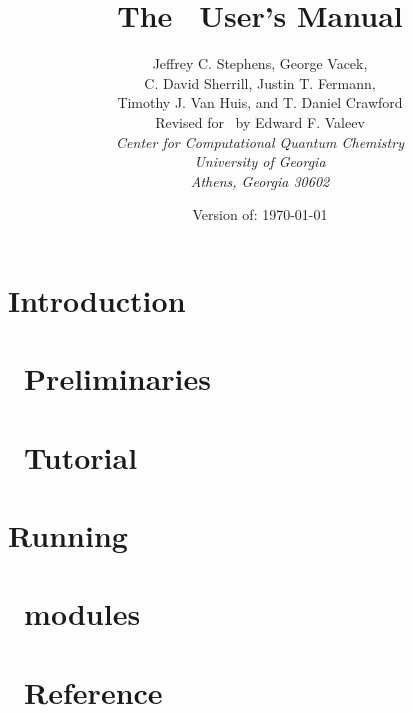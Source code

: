 \documentclass[12pt]{article}
\begin{document}


\title{\vspace{2.0in} {\bf The \PSIthree\ User's Manual}}

\author{Jeffrey C. Stephens, George Vacek, \\
C. David Sherrill, Justin T. Fermann, \\
Timothy J. Van Huis, and T. Daniel Crawford \\
Revised for \PSIthree\ by Edward F. Valeev \\
{\em Center for Computational Quantum Chemistry} \\
{\em University of Georgia} \\ 
{\em Athens, Georgia 30602}}

\date{Version of:  \today}
\maketitle
\thispagestyle{empty}

\newpage
\tableofcontents
\newpage

\section{Introduction} \label{introduction}


\section{\PSIthree\ Preliminaries} \label{preliminary}


\section{\PSIthree\ Tutorial} \label{tutorial}


\section{Running \PSIthree} \label{running}


\section{\PSIthree\ modules} \label{modules}


\newpage
\appendix
\section{\PSIthree\ Reference}\label{PSI_Reference}






\end{document}
